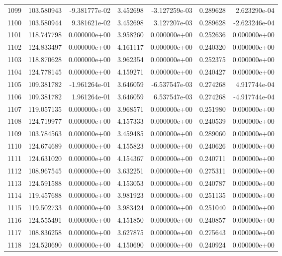 \begin{tabular}{rrrrrrr}
1099 & 103.580943 & -9.381777e-02 &  3.452698 & -3.127259e-03 &    0.289628 &  2.623290e-04 \\
1100 & 103.580944 &  9.381621e-02 &  3.452698 &  3.127207e-03 &    0.289628 & -2.623246e-04 \\
1101 & 118.747798 &  0.000000e+00 &  3.958260 &  0.000000e+00 &    0.252636 &  0.000000e+00 \\
1102 & 124.833497 &  0.000000e+00 &  4.161117 &  0.000000e+00 &    0.240320 &  0.000000e+00 \\
1103 & 118.870628 &  0.000000e+00 &  3.962354 &  0.000000e+00 &    0.252375 &  0.000000e+00 \\
1104 & 124.778145 &  0.000000e+00 &  4.159271 &  0.000000e+00 &    0.240427 &  0.000000e+00 \\
1105 & 109.381782 & -1.961264e-01 &  3.646059 & -6.537547e-03 &    0.274268 &  4.917744e-04 \\
1106 & 109.381782 &  1.961264e-01 &  3.646059 &  6.537547e-03 &    0.274268 & -4.917744e-04 \\
1107 & 119.057135 &  0.000000e+00 &  3.968571 &  0.000000e+00 &    0.251980 &  0.000000e+00 \\
1108 & 124.719977 &  0.000000e+00 &  4.157333 &  0.000000e+00 &    0.240539 &  0.000000e+00 \\
1109 & 103.784563 &  0.000000e+00 &  3.459485 &  0.000000e+00 &    0.289060 &  0.000000e+00 \\
1110 & 124.674689 &  0.000000e+00 &  4.155823 &  0.000000e+00 &    0.240626 &  0.000000e+00 \\
1111 & 124.631020 &  0.000000e+00 &  4.154367 &  0.000000e+00 &    0.240711 &  0.000000e+00 \\
1112 & 108.967545 &  0.000000e+00 &  3.632251 &  0.000000e+00 &    0.275311 &  0.000000e+00 \\
1113 & 124.591588 &  0.000000e+00 &  4.153053 &  0.000000e+00 &    0.240787 &  0.000000e+00 \\
1114 & 119.457688 &  0.000000e+00 &  3.981923 &  0.000000e+00 &    0.251135 &  0.000000e+00 \\
1115 & 119.502733 &  0.000000e+00 &  3.983424 &  0.000000e+00 &    0.251040 &  0.000000e+00 \\
1116 & 124.555491 &  0.000000e+00 &  4.151850 &  0.000000e+00 &    0.240857 &  0.000000e+00 \\
1117 & 108.836258 &  0.000000e+00 &  3.627875 &  0.000000e+00 &    0.275643 &  0.000000e+00 \\
1118 & 124.520690 &  0.000000e+00 &  4.150690 &  0.000000e+00 &    0.240924 &  0.000000e+00 \\

\end{tabular}
